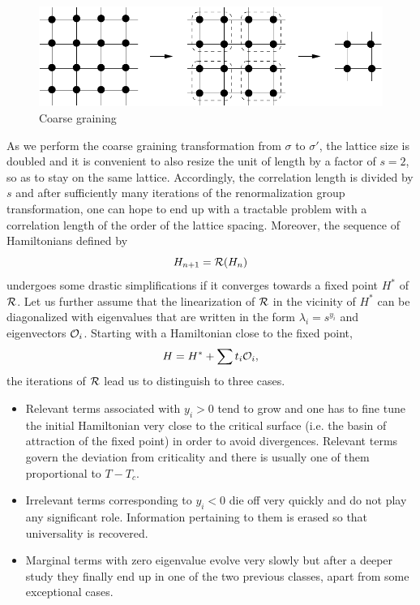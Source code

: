 \documentclass[10pt,here,feynmf]{article}
\begin{document}
\begin{figure}
\begin{center}
\includegraphics[width=12cm]{coarse.pdf}
\caption{Coarse graining}
\label{block}
\end{center}
\end{figure}



As we perform the coarse graining transformation from  $\sigma$ to $\sigma'$, the lattice size is doubled and it is convenient to also resize the unit of length by a factor of $s=2$, so as to stay on the same lattice. Accordingly, the correlation length is divided by $s$ and after sufficiently many iterations of the renormalization group transformation, one can hope to end up with a tractable problem with a correlation length of the order of the lattice spacing.  Moreover, the sequence of Hamiltonians defined by
\begin{equation}
H_{n+1}={\cal R}(H_{n})
\end{equation}
undergoes some drastic simplifications if it converges towards a fixed point $H^{*}$ of ${\cal R}$. Let us further assume that the linearization of ${\cal R}$ in the vicinity of $H^{*}$ can be diagonalized with eigenvalues that are written in the form $\lambda_{i}=s^{y_{i}}$ and eigenvectors ${\cal O}_{i}$. Starting with a Hamiltonian close to the fixed point, 
\begin{equation}
H=H^{*}+\sum t_{i}{\cal O}_{i},
\end{equation}
the iterations of ${\cal R}$ lead us to distinguish to three cases.

\begin{itemize}
\item
Relevant terms associated with 
$y_i>0$ tend to grow and one has to fine tune the initial Hamiltonian very close to the critical surface (i.e. the basin of attraction of the fixed point) in order to avoid divergences. Relevant terms govern the deviation from criticality and there is usually one of them proportional to $T-T_{c}$.

\item
Irrelevant terms corresponding to $y_{i}<0$ die off very quickly and do not play any significant role.  Information pertaining to them is erased so that universality is recovered.
\item
Marginal terms with zero eigenvalue evolve very slowly but after a deeper study they finally end up in one of the two previous classes, apart from some exceptional cases.
\end{itemize}   
\end{document}
